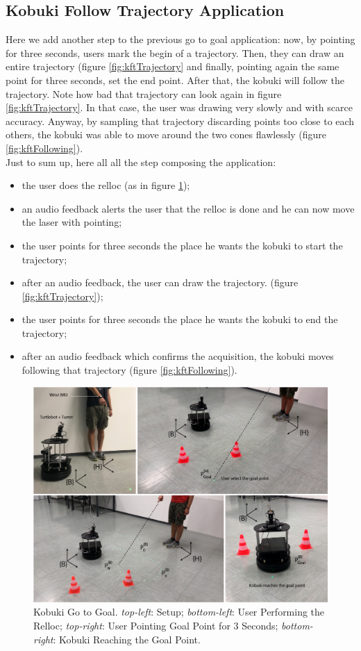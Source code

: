 \subsection{Kobuki Follow Trajectory Application}
Here we add another step to the previous go to goal application: now, by pointing for three seconds, users mark the begin of a trajectory. Then, they can draw an entire trajectory (figure \ref{fig:kftTrajectory} and finally, pointing again the same point for three seconds, set the end point. After that, the kobuki will follow the trajectory. Note how bad that trajectory can look again in figure \ref{fig:kftTrajectory}. In that case, the user was drawing very slowly and with scarce accuracy. Anyway, by sampling that trajectory discarding points too close to each others, the kobuki was able to move around the two cones flawlessly (figure \ref{fig:kftFollowing}).\\
Just to sum up, here all all the step composing the application:
\begin{itemize}
    \item the user does the relloc (as in figure \ref{fig:kgtgDemo1});
    \item an audio feedback alerts the user that the relloc is done and he can now move the laser with pointing;
    \item the user points for three seconds the place he wants the kobuki to start the trajectory;
    \item after an audio feedback, the user can draw the trajectory. (figure \ref{fig:kftTrajectory});
    \item the user points for three seconds the place he wants the kobuki to end the trajectory;
    \item after an audio feedback which confirms the acquisition, the kobuki moves following that trajectory (figure \ref{fig:kftFollowing}).
\end{itemize}
\begin{figure}
	\centering
	\includegraphics[width=\textwidth]{img/kgtgDemo1.png}%
	\caption[Kobuki Go to Goal]{Kobuki Go to Goal. \emph{top-left}: Setup; \emph{bottom-left}: User Performing the Relloc; \emph{top-right}: User Pointing Goal Point for 3 Seconds; \emph{bottom-right}: Kobuki Reaching the Goal Point.}
	\label{fig:kgtgDemo1}
\end{figure}
